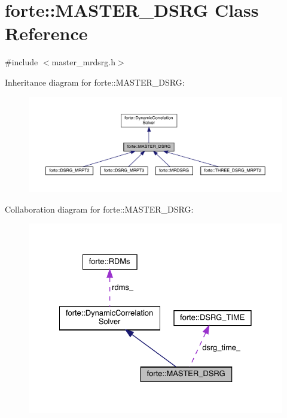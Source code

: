 \hypertarget{classforte_1_1_m_a_s_t_e_r___d_s_r_g}{}\section{forte\+:\+:M\+A\+S\+T\+E\+R\+\_\+\+D\+S\+RG Class Reference}
\label{classforte_1_1_m_a_s_t_e_r___d_s_r_g}


{\ttfamily \#include $<$master\+\_\+mrdsrg.\+h$>$}



Inheritance diagram for forte\+:\+:M\+A\+S\+T\+E\+R\+\_\+\+D\+S\+RG\+:
\nopagebreak
\begin{figure}[H]
\begin{center}
\leavevmode
\includegraphics[width=350pt]{classforte_1_1_m_a_s_t_e_r___d_s_r_g__inherit__graph}
\end{center}
\end{figure}


Collaboration diagram for forte\+:\+:M\+A\+S\+T\+E\+R\+\_\+\+D\+S\+RG\+:
\nopagebreak
\begin{figure}[H]
\begin{center}
\leavevmode
\includegraphics[width=328pt]{classforte_1_1_m_a_s_t_e_r___d_s_r_g__coll__graph}
\end{center}
\end{figure}
